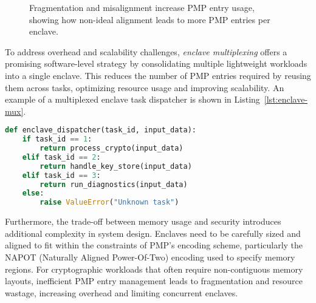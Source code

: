 \begin{figure}[htbp]
\centering
{}
\caption{Fragmentation and misalignment increase PMP entry usage, showing how non-ideal alignment leads to more PMP entries per enclave.}
\label{fig:pmp-fragmentation-entries}
\end{figure}

To address overhead and scalability challenges, \emph{enclave multiplexing} offers a promising software-level strategy by consolidating multiple lightweight workloads into a single enclave. This reduces the number of PMP entries required by reusing them across tasks, optimizing resource usage and improving scalability. An example of a multiplexed enclave task dispatcher is shown in Listing~\ref{lst:enclave-mux}.

\begin{lstlisting}[language=Python, caption={Multiplexed enclave task dispatcher.}, label={lst:enclave-mux}]
def enclave_dispatcher(task_id, input_data):
    if task_id == 1:
        return process_crypto(input_data)
    elif task_id == 2:
        return handle_key_store(input_data)
    elif task_id == 3:
        return run_diagnostics(input_data)
    else:
        raise ValueError("Unknown task")
\end{lstlisting}

Furthermore, the trade-off between memory usage and security introduces additional complexity in system design. Enclaves need to be carefully sized and aligned to fit within the constraints of PMP's encoding scheme, particularly the NAPOT (Naturally Aligned Power-Of-Two) encoding used to specify memory regions. For cryptographic workloads that often require non-contiguous memory layouts, inefficient PMP entry management leads to fragmentation and resource wastage, increasing overhead and limiting concurrent enclaves.

